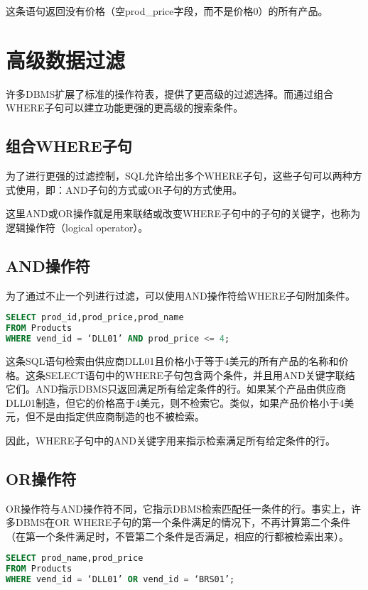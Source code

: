 这条语句返回没有价格（空prod\_price字段，而不是价格0）的所有产品。


\section{高级数据过滤}

许多DBMS扩展了标准的操作符表，提供了更高级的过滤选择。而通过组合WHERE子句可以建立功能更强的更高级的搜索条件。
\subsection{组合WHERE子句}

为了进行更强的过滤控制，SQL允许给出多个WHERE子句，这些子句可以两种方式使用，即：AND子句的方式或OR子句的方式使用。

这里AND或OR操作就是用来联结或改变WHERE子句中的子句的关键字，也称为逻辑操作符（logical operator）。
\subsection{AND操作符}


为了通过不止一个列进行过滤，可以使用AND操作符给WHERE子句附加条件。

\begin{lstlisting}[language=SQL]
SELECT prod_id,prod_price,prod_name
FROM Products
WHERE vend_id = ‘DLL01’ AND prod_price <= 4;
\end{lstlisting}

这条SQL语句检索由供应商DLL01且价格小于等于4美元的所有产品的名称和价格。这条SELECT语句中的WHERE子句包含两个条件，并且用AND关键字联结它们。AND指示DBMS只返回满足所有给定条件的行。如果某个产品由供应商DLL01制造，但它的价格高于4美元，则不检索它。类似，如果产品价格小于4美元，但不是由指定供应商制造的也不被检索。

因此，WHERE子句中的AND关键字用来指示检索满足所有给定条件的行。
\subsection{OR操作符}


OR操作符与AND操作符不同，它指示DBMS检索匹配任一条件的行。事实上，许多DBMS在OR WHERE子句的第一个条件满足的情况下，不再计算第二个条件（在第一个条件满足时，不管第二个条件是否满足，相应的行都被检索出来）。

\begin{lstlisting}[language=SQL]
SELECT prod_name,prod_price
FROM Products
WHERE vend_id = ‘DLL01’ OR vend_id = ‘BRS01’;
\end{lstlisting}


